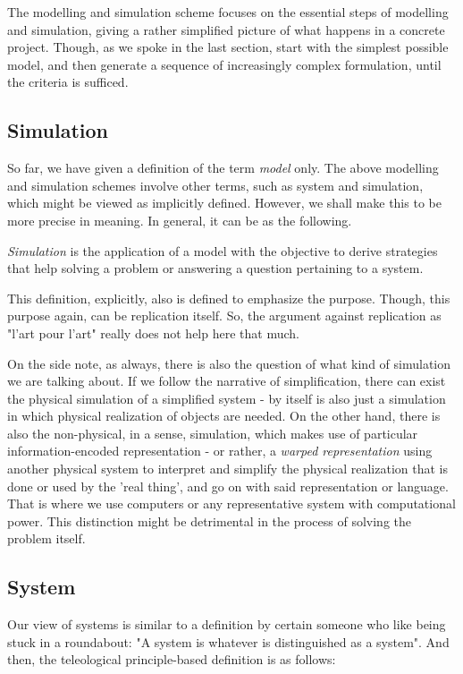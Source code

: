 The modelling and simulation scheme focuses on the essential steps of modelling and simulation, giving a rather simplified picture of what happens in a concrete project. Though, as we spoke in the last section, start with the simplest possible model, and then generate a sequence of increasingly complex formulation, until the criteria is sufficed. 

\subsection{Simulation}
So far, we have given a definition of the term \textit{model} only. The above modelling and simulation schemes involve other terms, such as system and simulation, which might be viewed as implicitly defined. However, we shall make this to be more precise in meaning. In general, it can be as the following. 

\begin{definition}[Simulation]
    \textit{Simulation} is the application of a model with the objective to derive strategies that help solving a problem or answering a question pertaining to a system. 
\end{definition}
This definition, explicitly, also is defined to emphasize the purpose. Though, this purpose again, can be replication itself. So, the argument against replication as "l'art pour l'art" really does not help here that much. 

On the side note, as always, there is also the question of what kind of simulation we are talking about. If we follow the narrative of simplification, there can exist the physical simulation of a simplified system - by itself is also just a simulation in which physical realization of objects are needed. On the other hand, there is also the non-physical, in a sense, simulation, which makes use of particular information-encoded representation - or rather, a \textit{warped representation} using another physical system to interpret and simplify the physical realization that is done or used by the 'real thing', and go on with said representation or language. That is where we use computers or any representative system with computational power. This distinction might be detrimental in the process of solving the problem itself. 
\subsection{System}
Our view of systems is similar to a definition by certain someone who like being stuck in a roundabout: "A system is whatever is distinguished as a system". And then, the teleological principle-based definition is as follows: 

